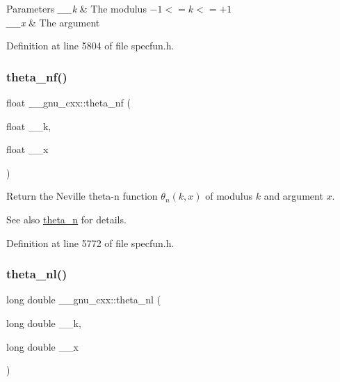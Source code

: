 \begin{DoxyParams}{Parameters}
{\em \+\_\+\+\_\+k} & The modulus $ -1 <= k <= +1 $ \\
\hline
{\em \+\_\+\+\_\+x} & The argument \\
\hline
\end{DoxyParams}


Definition at line 5804 of file specfun.\+h.

\mbox{\label{group__gnu__math__spec__func_ga5298a95e02bd909d55e59c1f2a0b51f8}} 
\subsubsection{\texorpdfstring{theta\+\_\+nf()}{theta\_nf()}}
{\footnotesize\ttfamily float \+\_\+\+\_\+gnu\+\_\+cxx\+::theta\+\_\+nf (\begin{DoxyParamCaption}\item[{float}]{\+\_\+\+\_\+k,  }\item[{float}]{\+\_\+\+\_\+x }\end{DoxyParamCaption})\hspace{0.3cm}{\ttfamily [inline]}}

Return the Neville theta-\/n function $ \theta_n(k,x) $ of modulus $ k $ and argument $ x $.

\begin{DoxySeeAlso}{See also}
\hyperlink{group__gnu__math__spec__func_ga202778bd650e04e9f3729bfca35c32e2}{theta\+\_\+n} for details. 
\end{DoxySeeAlso}


Definition at line 5772 of file specfun.\+h.

\mbox{\label{group__gnu__math__spec__func_ga907f6c147387d55d2dfccbc58d1f1bc5}} 
\subsubsection{\texorpdfstring{theta\+\_\+nl()}{theta\_nl()}}
{\footnotesize\ttfamily long double \+\_\+\+\_\+gnu\+\_\+cxx\+::theta\+\_\+nl (\begin{DoxyParamCaption}\item[{long double}]{\+\_\+\+\_\+k,  }\item[{long double}]{\+\_\+\+\_\+x }\end{DoxyParamCaption})\hspace{0.3cm}{\ttfamily [inline]}}

